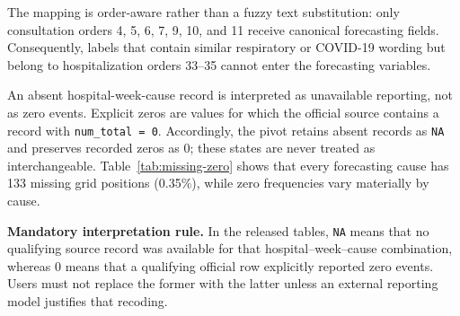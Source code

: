 \documentclass[data,datadescriptor,submit,moreauthors,pdftex]{Definitions/mdpi}
\begin{document}
The mapping is order-aware rather than a fuzzy text substitution: only consultation orders 4, 5, 6, 7, 9, 10, and 11 receive canonical forecasting fields. Consequently, labels that contain similar respiratory or COVID-19 wording but belong to hospitalization orders 33--35 cannot enter the forecasting variables.

An absent hospital-week-cause record is interpreted as unavailable reporting, not as zero events. Explicit zeros are values for which the official source contains a record with \texttt{num\_total = 0}. Accordingly, the pivot retains absent records as \texttt{NA} and preserves recorded zeros as 0; these states are never treated as interchangeable. Table~\ref{tab:missing-zero} shows that every forecasting cause has 133 missing grid positions (0.35\%), while zero frequencies vary materially by cause.

\noindent\textbf{Mandatory interpretation rule.} In the released tables, \texttt{NA} means that no qualifying source record was available for that hospital--week--cause combination, whereas 0 means that a qualifying official row explicitly reported zero events. Users must not replace the former with the latter unless an external reporting model justifies that recoding.
\end{document}
